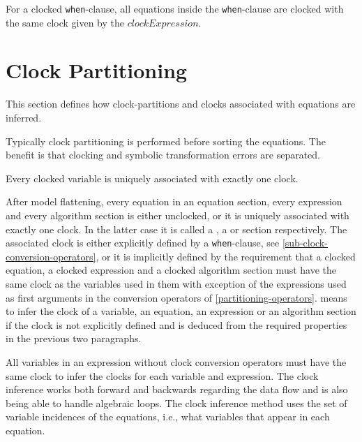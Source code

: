 For a clocked \lstinline!when!-clause, all equations inside the \lstinline!when!-clause are clocked with the same clock given by the $\mathit{clockExpression}$.

\section{Clock Partitioning}\label{clock-partitioning}

This section defines how clock-partitions and clocks associated with equations are inferred.

\begin{nonnormative}
Typically clock partitioning is performed before sorting the equations.
The benefit is that clocking and symbolic transformation errors are separated.
\end{nonnormative}

Every clocked variable is uniquely associated with exactly one clock.

After model flattening, every equation in an equation section, every expression and every algorithm section is either unclocked, or it is uniquely associated with exactly one clock.
In the latter case it is called a , a  or  section respectively.
The associated clock is either explicitly defined by a \lstinline!when!-clause, see \cref{sub-clock-conversion-operators}, or it is implicitly defined by the requirement that a clocked equation, a clocked expression and a clocked algorithm section must have the same clock as the variables used in them with exception of the expressions used as first arguments in the conversion operators of \cref{partitioning-operators}.
 means to infer the clock of a variable, an equation, an expression or an algorithm section if the clock is not explicitly defined and is deduced from the required properties in the previous two paragraphs.

All variables in an expression without clock conversion operators must have the same clock to infer the clocks for each variable and expression.
The clock inference works both forward and backwards regarding the data flow and is also being able to handle algebraic loops.
The clock inference method uses the set of variable incidences of the equations, i.e., what variables that appear in each equation.

